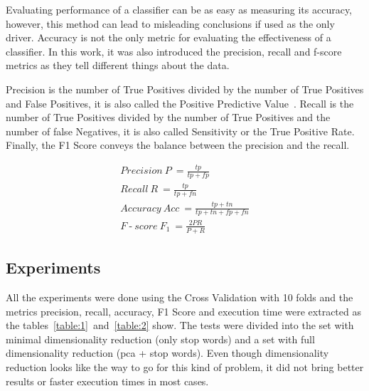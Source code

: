 \documentclass[letterpaper,10pt]{article}
\DeclareMathOperator{\dash}{-}
\theoremstyle{mytheor}
\begin{document}
Evaluating performance of a classifier can be as easy as measuring its accuracy, however, this method can lead to misleading conclusions if used as the only driver. Accuracy is not the only metric for evaluating the effectiveness of a classifier. In this work, it was also introduced the precision, recall and f-score metrics as they tell different things about the data.

Precision is the number of True Positives divided by the number of True Positives and False Positives, it is also called the Positive Predictive Value~\cite{kohavi1995study}. Recall is the number of True Positives divided by the number of True Positives and the number of false Negatives, it is also called Sensitivity or the True Positive Rate. Finally, the F1 Score conveys the balance between the precision and the recall.

\begin{gather}
Precision\ P\ = \frac{tp}{tp + fp} \\ 
Recall\ R\ = \frac{tp}{tp + fn} \\
Accuracy\ Acc\ = \frac{tp + tn}{tp + tn + fp + fn} \\
F \dash score\ F_{1}\ = \frac{2PR}{P+R}
\end{gather}

\subsection{Experiments}

All the experiments were done using the Cross Validation with 10 folds and the metrics precision, recall, accuracy, F1 Score and execution time were extracted as the tables~\ref{table:1}~and~\ref{table:2} show. The tests were divided into the set with minimal dimensionality reduction (only stop words) and a set with full dimensionality reduction (pca + stop words). Even though dimensionality reduction looks like the way to go for this kind of problem, it did not bring better results or faster execution times in most cases.
\end{document}
